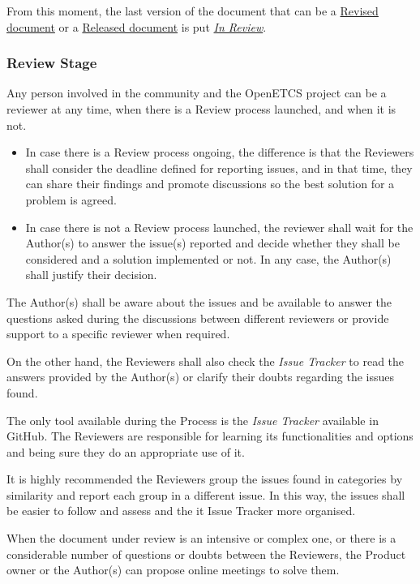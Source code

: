 \documentclass{template/openetcs_article}
\begin{document}
From this moment, the last version of the document that can be a \underline{Revised document} or a \underline{Released document} is put {\it \underline{In Review}}.

\subsubsection{Review Stage}

Any person involved in the community and the OpenETCS project can be a reviewer at any time, when there is a Review process launched, and when it is not.

\begin{itemize}
\item In case there is a Review process ongoing, the difference is that the Reviewers shall consider the deadline defined for reporting issues, and in that time, they can share their findings and promote discussions so the best solution for a problem is agreed. 
\item In case there is not a Review process launched, the reviewer shall wait for the Author(s) to answer the issue(s) reported and decide whether they shall be considered and a solution implemented or not. In any case, the Author(s) shall justify their decision.
\end{itemize}

The Author(s) shall be aware about the issues and be available to answer the questions asked during the discussions between different reviewers or provide support to a specific reviewer when required.

On the other hand, the Reviewers shall also check the {\it Issue Tracker} to read the answers provided by the Author(s) or clarify their doubts regarding the issues found.

The only tool available during the Process is the {\it Issue Tracker} available in GitHub. The Reviewers are responsible for learning its functionalities and options and being sure they do an appropriate use of it.

It is highly recommended the Reviewers group the issues found in categories by similarity and report each group in a different issue. In this way, the issues shall be easier to follow and assess and the  {it Issue Tracker} more organised.

When the document under review is an intensive or complex one, or there is a considerable number of questions or doubts between the Reviewers, the Product owner or the Author(s) can propose online meetings to solve them.  
\end{document}
